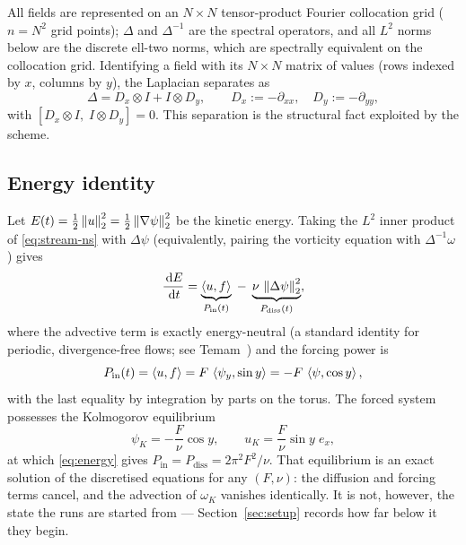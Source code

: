 All fields are represented on an $N \times N$ tensor-product Fourier
collocation grid ($n = N^2$ grid points); $\Delta$ and $\Delta^{-1}$ are the
spectral operators, and all $L^2$ norms below are the discrete
ell-two norms, which are spectrally equivalent on the collocation grid.
Identifying a field with its $N \times N$ matrix of values (rows indexed by
$x$, columns by $y$), the Laplacian separates as
\begin{equation}
  \Delta = D_x \otimes I + I \otimes D_y,
  \qquad D_x := -\partial_{xx}, \quad D_y := -\partial_{yy},
  \label{eq:lap-sep}
\end{equation}
with $[D_x \otimes I, \; I \otimes D_y] = 0$. This separation is the
structural fact exploited by the scheme.

\subsection{Energy identity}
\label{sec:energy}

Let $E(t) = \tfrac{1}{2}\left\lVert u \right\rVert_2^2 = \tfrac{1}{2}\left\lVert \nabla\psi \right\rVert_2^2$ be the
kinetic energy. Taking the $L^2$ inner product of \eqref{eq:stream-ns} with
$\Delta \psi$ (equivalently, pairing the vorticity equation with
$\Delta^{-1}\omega$) gives
\begin{equation}
  \frac{\,\mathrm{d} E}{\,\mathrm{d} t}
  = \underbrace{\left\langle u, f \right\rangle}_{P_{\mathrm{in}}(t)}
  \;-\;
  \underbrace{\nu\, \left\lVert \Delta \psi \right\rVert_2^2}_{P_{\mathrm{diss}}(t)},
  \label{eq:energy}
\end{equation}
where the advective term is exactly energy-neutral (a standard identity for
periodic, divergence-free flows; see Temam~\cite{temam1977}) and the forcing
power is
\begin{equation}
  P_{\mathrm{in}}(t)
  = \left\langle u, f \right\rangle
  = F\,\left\langle \psi_y, \sin y \right\rangle
  = -F\,\left\langle \psi, \cos y \right\rangle,
  \label{eq:pin}
\end{equation}
with the last equality by integration by parts on the torus. The forced
system possesses the Kolmogorov equilibrium
\begin{equation}
  \psi_K = -\frac{F}{\nu}\cos y,
  \qquad
  u_K = \frac{F}{\nu}\sin y \; e_x,
  \label{eq:kolmogorov}
\end{equation}
at which \eqref{eq:energy} gives $P_{\mathrm{in}} = P_{\mathrm{diss}}
= 2\pi^2 F^2/\nu$. That equilibrium is an exact solution of the discretised
equations for any $(F,\nu)$: the diffusion and forcing terms cancel, and the
advection of $\omega_K$ vanishes identically. It is not, however, the state the
runs are started from --- Section~\ref{sec:setup} records how far below it they
begin.

